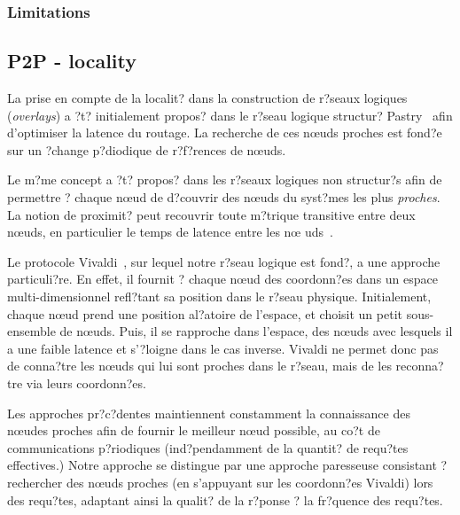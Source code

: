 \subsubsection{Limitations}






\subsection{P2P - locality}


La prise en compte de la localit? dans la construction de r?seaux logiques
(\emph{overlays}) a ?t? initialement propos? dans le r?seau logique structur?
Pastry~\cite{pastry} afin d'optimiser la latence du routage. La recherche de ces
n\oe uds proches est fond?e sur un ?change p?diodique de r?f?rences de n\oe uds.

Le m?me concept a ?t? propos? dans les r?seaux logiques non structur?s afin de
permettre ? chaque n\oe ud de d?couvrir des n\oe uds du syst?mes les plus
\emph{proches}. La notion de proximit? peut recouvrir toute m?trique transitive
entre deux n\oe uds, en particulier le temps de latence entre les n\oe
uds~\cite{refquivabienmarindoittrouver}.

Le protocole Vivaldi~\cite{dabek:2001:sigcomm04}, sur lequel notre r?seau logique est fond?,
a une approche particuli?re. En effet, il fournit ? chaque n\oe ud des
coordonn?es dans un espace multi-dimensionnel refl?tant sa position dans le
r?seau physique. Initialement, chaque n\oe ud prend une position al?atoire de
l'espace, et choisit un petit sous-ensemble de n\oe uds. Puis, il se rapproche
dans l'espace, des n\oe uds avec lesquels il a une faible latence et s'?loigne
dans le cas inverse. Vivaldi ne permet donc pas de conna?tre les n\oe uds qui
lui sont proches dans le r?seau, mais de les reconna?tre via leurs coordonn?es.

Les approches pr?c?dentes maintiennent constamment la connaissance des n\oe udes
proches afin de fournir le meilleur n\oe ud possible, au co?t de communications
p?riodiques (ind?pendamment de la quantit? de requ?tes effectives.) Notre
approche se distingue par une approche paresseuse consistant ? rechercher des
n\oe uds proches (en s'appuyant sur les coordonn?es Vivaldi) lors des requ?tes,
adaptant ainsi la qualit? de la r?ponse ? la fr?quence des requ?tes.

